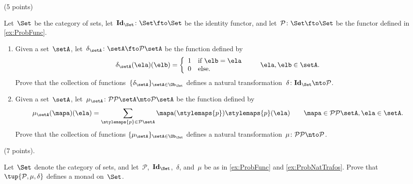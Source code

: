 \documentclass[paper=8.125in:10.250in,pagesize=pdftex,
    headinclude=false,footinclude=false,oneside,egregdoesnotlikesansseriftitles]{kaobook}
\begin{document}
\begin{gradedexercise}\label{ex:ProbNatTrafos} (5 points)


Let~$\Set$ be the category of sets, let~$\mathbf{Id}_\Set \colon \Set \fto \Set$ be the identity functor, and let~$\mathcal{P}\colon \Set \fto \Set$ be the functor defined in \cref{ex:ProbFunc}.
\begin{enumerate}
\item Given a set~$\setA$, let~$\delta_{\setA} \colon \setA \fto \mathcal{P} \setA$ be the function defined by
\begin{equation*}
\delta_\setA (\ela)(\elb) = \left\{\begin{array}{ll}
        1 & \text{if } \elb = \ela \\
        0 & \text{else.}
        \end{array}\right.
  \quad \quad \ela, \elb \in \setA.
\end{equation*}
Prove that the collection of functions~$\{ \delta_{\setA} \}_{\setA \in \Ob_{\Set}}$ defines a natural transformation~$\delta\colon \mathbf{Id}_\Set \nto \mathcal{P}$.
\item Given a set~$\setA$, let~$\mu_\setA \colon \mathcal{P} \mathcal{P} \setA \mto \mathcal{P} \setA$ be the function defined by
\begin{equation*}
\mu_\setA (\mapa)(\ela) = \sum_{\stylemaps{p} \in \mathcal{P} \setA} \mapa(\stylemaps{p}) \stylemaps{p}(\ela) \quad \quad \mapa \in \mathcal{P} \mathcal{P} \setA, \ela \in \setA.
\end{equation*}
Prove that the collection of functions $\{ \mu_{\setA} \}_{\setA \in \Ob_{\Set}}$ defines a natural transformation~$\mu\colon \mathcal{P} \mathcal{P} \nto \mathcal{P}$.
\end{enumerate}
\end{gradedexercise}


\newpage


\begin{gradedexercise}\label{ex:ProbMonad} (7 points).


Let~$\Set$ denote the category of sets, and let~$\mathcal{P}$,~$\mathbf{Id}_\Set$,~$\delta$, and~$\mu$ be as in \cref{ex:ProbFunc} and \cref{ex:ProbNatTrafos}.
Prove that~$\tup{\mathcal{P}, \mu, \delta}$ defines a monad on~$\Set$.
\end{gradedexercise}


\newpage
\end{document}
